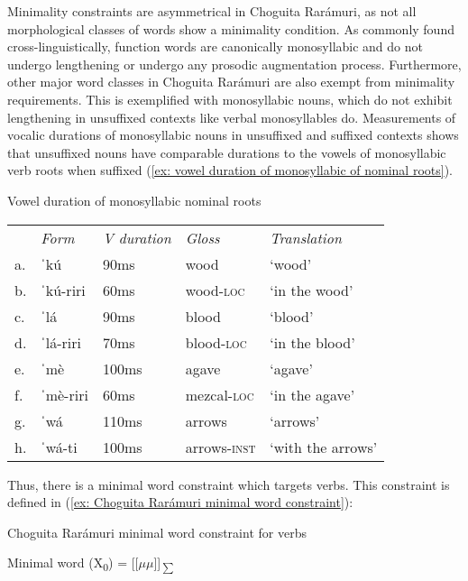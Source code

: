 Minimality constraints are asymmetrical in Choguita Rarámuri, as not all morphological classes of words show a minimality condition. As commonly found cross-linguistically, function words are canonically monosyllabic and do not undergo lengthening or undergo any prosodic augmentation process. Furthermore, other major word classes in Choguita Rarámuri are also exempt from minimality requirements. This is exemplified with monosyllabic nouns, which do not exhibit lengthening in unsuffixed contexts like verbal monosyllables do. Measurements of vocalic durations of monosyllabic nouns in unsuffixed and suffixed contexts shows that unsuffixed nouns have comparable durations to the vowels of monosyllabic verb roots when suffixed (\ref{ex: vowel duration of monosyllabic of nominal roots}).

\ea\label{ex: vowel duration of monosyllabic of nominal roots}
{Vowel duration of monosyllabic nominal roots}

\begin{tabular}{lllll}
       & \textit{Form} & \textit{V duration} & \textit{Gloss}  & \textit{Translation} \\
     a.& ˈkú  & 90ms & wood	&  ‘wood'\\
     b.& ˈkú-riri & 60ms &  wood-\textsc{loc} &  `in the wood' \\
     c.& ˈlá & 90ms & blood & ‘blood' \\
     d.& ˈlá-riri & 70ms & blood-\textsc{loc} &  `in the blood' \\
     e.& ˈmè	& 100ms &  agave & ‘agave’  \\
     f.& ˈmè-riri 	& 60ms &  mezcal-\textsc{loc}  & ‘in the agave’ \\
     g.& ˈwá 	& 110ms & arrows & ‘arrows’   \\
     h.& ˈwá-ti 	& 100ms & arrows-\textsc{inst} &  `with the arrows' \\
\end{tabular}
    \z

Thus, there is a minimal word constraint which targets verbs. This constraint is defined in (\ref{ex: Choguita Rarámuri minimal word constraint}):

\ea\label{ex: Choguita Rarámuri minimal word constraint}
{Choguita Rarámuri minimal word constraint for verbs}

Minimal word (X\textsubscript{0}) = [[$\mu$$\mu$]]\textsubscript{${\sum}$}

\z

